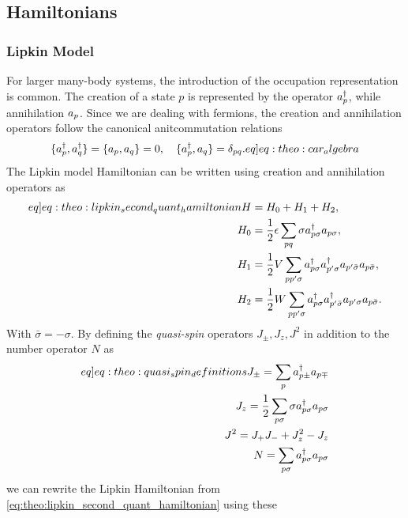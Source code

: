 
\subsection{Hamiltonians}
\subsubsection{Lipkin Model}
For larger many-body systems, the introduction of the occupation representation is common. The creation of a state $p$ is represented by the operator $a^{\dagger}_{p}$, while annihilation $a_{p}$. Since we are dealing with fermions, the creation and annihilation operators follow the canonical anitcommutation relations
\begin{align}
    \set{\crt{p},\crt{q}} = \set{\ani{p},\ani{q}} = 0, \hspace{10px}\set{\crt{p},\ani{q}} = \delta_{pq}. 
    \label[eq]{eq:theo:car_algebra}
\end{align}
The Lipkin model Hamiltonian can be written using creation and annihilation operators as 
\begin{align}
    \begin{split}\label[eq]{eq:theo:lipkin_second_quant_hamiltonian}
    H &= H_0 + H_1 + H_2, \\
    H_0 &= \frac{1}{2}\epsilon \sum_{pq} \sigma \crt{p\sigma} \ani{p\sigma}, \\
    H_1 &= \frac{1}{2}V \sum_{pp'\sigma} \crt{p\sigma}\crt{p'\sigma}\ani{p'\bar{\sigma}}\ani{p\bar{\sigma}}, \\
    H_2 &= \frac{1}{2}W \sum_{pp'\sigma} \crt{p\sigma} \crt{p'\bar{\sigma}} \ani{p'\sigma} \ani{p\bar{\sigma}}.
    \end{split}
\end{align}
With $\bar{\sigma} = -\sigma$. By defining the \textit{quasi-spin} operators $J_\pm , J_z, J^2$ in addition to the number operator $N$ as 
\begin{align}
    \begin{split}\label[eq]{eq:theo:quasi_spin_definitions}
        J_\pm = \sum_p \crt{p\pm}\ani{p\mp} \\
        J_z = \frac{1}{2}\sum_{p\sigma} \sigma \crt{p\sigma} \ani{p\sigma} \\
        J^2 = J_+ J_- + J_z^2 - J_z \\
        N = \sum_{p\sigma} \crt{p\sigma} \ani{p\sigma}
    \end{split}
\end{align}
we can rewrite the Lipkin Hamiltonian from \cref{eq:theo:lipkin_second_quant_hamiltonian} using these
